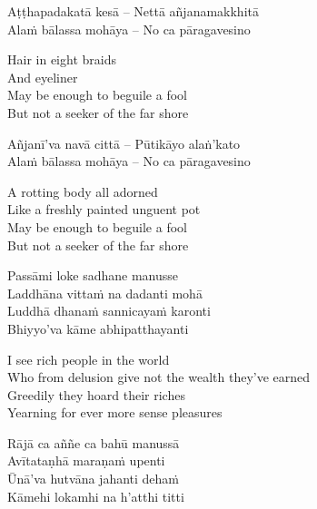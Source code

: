 \begin{verses}
  Aṭṭhapadakatā kesā – Nettā añjanamakkhitā\\
  Alaṁ bālassa mohāya – No ca pāragavesino
\end{verses}

\begin{english-verses}
  Hair in eight braids\\
  And eyeliner\\
  May be enough to beguile a fool\\
  But not a seeker of the far shore
\end{english-verses}

\begin{verses}
  Añjanī'va navā cittā – Pūtikāyo alaṅ'kato\\
  Alaṁ bālassa mohāya – No ca pāragavesino
\end{verses}

\begin{english-verses}
  A rotting body all adorned\\
  Like a freshly painted unguent pot\\
  May be enough to beguile a fool\\
  But not a seeker of the far shore
\end{english-verses}

\begin{verses}
  Passāmi loke sadhane manusse\\
  Laddhāna vittaṁ na dadanti mohā\\
  Luddhā dhanaṁ sannicayaṁ karonti\\
  Bhiyyo'va kāme abhipatthayanti
\end{verses}

\begin{english-verses}
  I see rich people in the world\\
  Who from delusion give not the wealth they've earned\\
  Greedily they hoard their riches\\
  Yearning for ever more sense pleasures
\end{english-verses}

\begin{verses}
  Rājā ca aññe ca bahū manussā\\
  Avītataṇhā maraṇaṁ upenti\\
  Ūnā'va hutvāna jahanti dehaṁ\\
  Kāmehi lokamhi na h'atthi titti
\end{verses}

